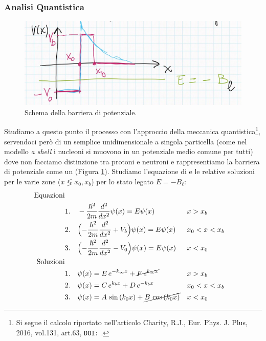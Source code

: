 \subsubsection{Analisi Quantistica}
\begin{figure}[h]
    \centering
    \includegraphics[scale=0.2]{Immagini/0325_pot.png}
    \caption{Schema della barriera di potenziale.}
    \label{0325_pot}
\end{figure}
\noindent Studiamo a questo punto il processo con l'approccio della meccanica quantistica\footnote{\label{0325_art}Si segue il calcolo riportato nell'articolo Charity, R.J., Eur. Phys. J. Plus, 2016, vol.131, art.63, \texttt{DOI:} .}, servendoci però di un semplice  unidimensionale a singola particella (come nel modello \textit{a shell} i nucleoni si muovono in un potenziale medio comune per tutti) dove non facciamo distinzione tra protoni e neutroni e rappresentiamo la barriera di potenziale come un  (Figura \ref{0325_pot}). Studiamo l'equazione di \Sch{} e le relative soluzioni per le varie zone ($x\lessgtr x_0,x_b$) per lo stato legato $E=-B_\ell$:
\begin{displaymath}
\begin{aligned}
\text{Equazioni}& & & \\
&1. & &-\frac{\hbar^2}{2m} \frac{d^2}{dx^2} \psi(x) = E\psi(x) & &x>x_b \\
&2. & &\Bigl ( -\frac{\hbar^2}{2m} \frac{d^2}{dx^2} + V_b \Bigr ) \psi(x) = E\psi(x) & &x_0<x<x_b \\
&3. & &\Bigl ( -\frac{\hbar^2}{2m} \frac{d^2}{dx^2}-V_0 \Bigr ) \psi(x) = E\psi(x) & &x<x_0 \\
\text{Soluzioni}& & & \\
&1. & &\psi(x) = E\,e^{-k_\infty x} + \cancel{F\,e^{k_\infty x}} & &x>x_b \\
&2. & &\psi(x) = C\,e^{k_b x} + D\, e^{-k_b x} & &x_0<x<x_b \\
&3. & &\psi(x) = A\,\sin{(k_0x)} + \cancel{B\,\cos{(k_0x)}} & &x<x_0 
\end{aligned}
\end{displaymath}
